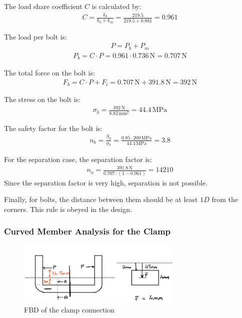 \documentclass[12pt]{article}
\begin{document}
The load share coefficient \( C \) is calculated by:
\begin{align}
C = \frac{k_b}{k_b + k_m} = \frac{219.5}{219.5 + 8.881} = 0.961
\end{align}

The load per bolt is:
\begin{align}
P = P_b + P_m
\end{align}
\begin{align}
P_b = C \cdot P = 0.961 \cdot 0.736 \, \text{N} = 0.707 \, \text{N}
\end{align}

The total force on the bolt is:
\begin{align}
F_b = C \cdot P + F_i = 0.707 \, \text{N} + 391.8 \, \text{N} = 392 \, \text{N}
\end{align}

The stress on the bolt is:
\begin{align}
\sigma_b = \frac{392 \, \text{N}}{8.82 \, \text{mm}^2} = 44.4 \, \text{MPa}
\end{align}

The safety factor for the bolt is:
\begin{align}
n_b = \frac{S_p}{\sigma_b} = \frac{0.85 \cdot 200 \, \text{MPa}}{44.4 \, \text{MPa}} = 3.8
\end{align}

For the separation case, the separation factor is:
\begin{align}
n_o = \frac{391.8 \, \text{N}}{0.707 \cdot (1 - 0.961)} = 14210
\end{align}
Since the separation factor is very high, separation is not possible.

Finally, for bolts, the distance between them should be at least \( 1D \) from the corners. This rule is obeyed in the design.

\subsubsection{Curved Member Analysis for the Clamp }
\begin{figure}[h]
    \centering
    \includegraphics[width=0.7\textwidth]{Figures/curvedmember.png}
    \caption{FBD of the clamp connection}
    \label{fig:curvedmember}
\end{figure}
\end{document}
